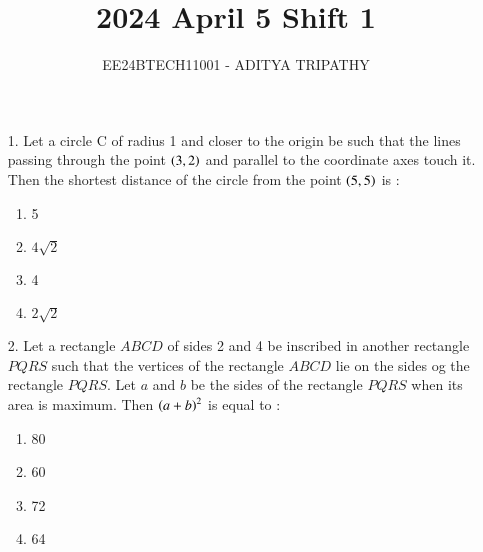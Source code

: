 \documentclass[journal,12pt,onecolumn]{IEEEtran}
\theoremstyle{remark}
\begin{document}

\vspace{3cm}

\title{2024 April 5 Shift 1}
\author{EE24BTECH11001 -  ADITYA TRIPATHY}
\maketitle

\renewcommand{\thefigure}{\theenumi}
\renewcommand{\thetable}{\theenumi}

\begin{enumerate}
	\item[1.] 
	    Let a circle C of radius 1 and closer to the origin be such that the lines
        passing through the point $\left(3, 2\right)$ and parallel to the coordinate axes touch it.
        Then the shortest distance of the circle from the point $\left(5, 5\right)$ is :
		\hfill{}
	\begin{multicols}{4}
		\begin{enumerate}
			\item 5
			\columnbreak
        \item $4\sqrt{2}$
			\columnbreak
			\item 4
			\columnbreak
        \item $2\sqrt{2}$
		\end{enumerate}
	\end{multicols}

	\item[2.] 
        Let a rectangle $ABCD$ of sides 2 and 4 be inscribed in another rectangle $PQRS$
        such that the vertices of the rectangle $ABCD$ lie on the sides og the rectangle $PQRS$.
        Let $a$ and $b$ be the sides of the rectangle $PQRS$ when its area is maximum. Then
        $\left(a + b\right)^2$ is equal to :
		\begin{multicols}{4}
		\begin{enumerate}
			\item 80 \columnbreak
			\item 60 \columnbreak
			\item 72 \columnbreak
			\item 64
		\end{enumerate}
	\end{multicols}



\end{enumerate}
\end{document}
